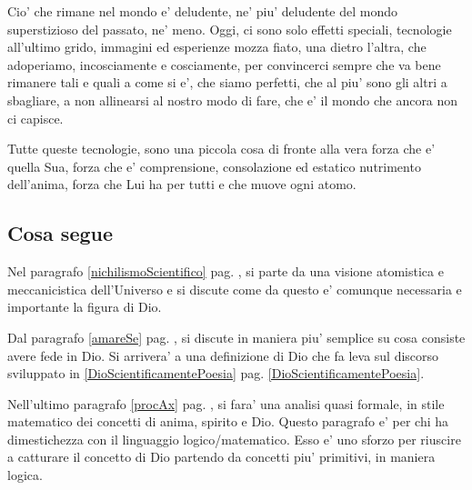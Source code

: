 Cio' che rimane nel mondo e' deludente, ne' piu' deludente del mondo superstizioso del passato, ne' meno. Oggi, ci sono solo effetti speciali, tecnologie all'ultimo grido, immagini ed esperienze mozza fiato, una dietro l'altra, che adoperiamo, incosciamente e cosciamente, per convincerci sempre che va bene rimanere tali e quali a come si e', che siamo perfetti, che al piu' sono gli altri a sbagliare, a non allinearsi al nostro modo di fare, che e' il mondo che ancora non ci capisce.

Tutte queste tecnologie, sono una piccola cosa di fronte alla vera forza che e' quella Sua, forza che e' comprensione, consolazione ed estatico nutrimento dell'anima, forza che Lui ha per tutti e che muove ogni atomo.

\subsection{Cosa segue}

Nel paragrafo \ref{nichilismoScientifico} pag. \pageref{nichilismoScientifico}, si parte da una visione atomistica e meccanicistica dell'Universo e si discute come da questo e' comunque necessaria e importante la figura di Dio. 

Dal paragrafo \ref{amareSe} pag. \pageref{amareSe}, si discute in maniera piu' semplice su cosa consiste avere fede in Dio. Si arrivera' a una definizione di Dio che fa leva sul discorso sviluppato in \ref{DioScientificamentePoesia} pag. \ref{DioScientificamentePoesia}.

Nell'ultimo paragrafo \ref{procAx} pag. \pageref{procAx}, si fara' una analisi quasi formale, in stile matematico dei concetti di anima, spirito e Dio. Questo paragrafo e' per chi ha dimestichezza con il linguaggio logico/matematico. Esso e' uno sforzo per riuscire a catturare il concetto di Dio partendo da concetti piu' primitivi, in maniera logica. 

